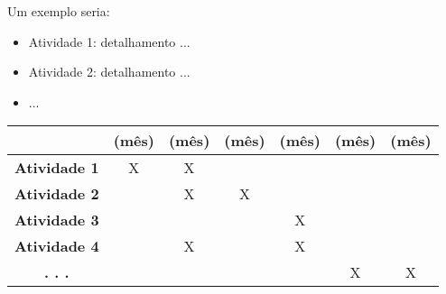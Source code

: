 Um exemplo seria:
\begin{itemize}
\item Atividade 1: detalhamento ...
\item Atividade 2: detalhamento ...
\item ...
\end{itemize}

\begin{table}[h]
\centering
\begin{tabular}{c|c|c|c|c|c|c|}
\cline{2-7}
\multicolumn{1}{l|}{} & \textbf{(mês)} & \textbf{(mês)} & \textbf{(mês)} & \textbf{(mês)} & \textbf{(mês)} & \textbf{(mês)} \\ \hline
\multicolumn{1}{|c|}{\textbf{Atividade 1}} & X & X &  &  &  &  \\ \hline
\multicolumn{1}{|c|}{\textbf{Atividade 2}} &  & X & X &  &  &  \\ \hline
\multicolumn{1}{|c|}{\textbf{Atividade 3}} &  &  &  & X &  &  \\ \hline
\multicolumn{1}{|c|}{\textbf{Atividade 4}} &  & X &  & X &  &  \\ \hline
\multicolumn{1}{|c|}{\textbf{. . .}} &  &  &  &  & X & X \\ \hline
\end{tabular}
\end{table}